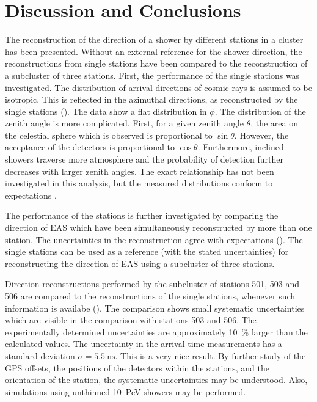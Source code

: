 \section{Discussion and Conclusions}

The reconstruction of the direction of a shower by different stations in a
cluster has been presented. Without an external reference for the shower
direction, the reconstructions from single stations have been compared to the
reconstruction of a subcluster of three stations. First, the performance of the
single stations was investigated. The distribution of arrival directions of
cosmic rays is assumed to be isotropic.
This is reflected in the azimuthal directions, as reconstructed by the single
stations (). The data show a flat distribution
in $\phi$. The distribution of the zenith angle is more complicated. First, for
a given zenith angle $\theta$, the area on the celestial sphere which is
observed is proportional to $\sin\theta$.
However, the acceptance of the detectors is proportional to $\cos\theta$.
Furthermore, inclined showers traverse more atmosphere and the probability of
detection further decreases with larger zenith angles. The exact relationship
has not been investigated in this analysis, but the measured distributions
conform to expectations \cite{Grupen:2005}.

The performance of the stations is further investigated by comparing the
direction of EAS which have been simultaneously reconstructed by more than one
station. The uncertainties in the reconstruction agree with
expectations (). The single
stations can be used as a reference (with the stated uncertainties) for
reconstructing the direction of EAS using a subcluster of three stations.

Direction reconstructions performed by the subcluster of stations 501, 503 and
506 are compared to the reconstructions of the single stations, whenever such
information is availabe (). The comparison
shows small systematic uncertainties which are visible in the comparison with
stations 503 and 506. The experimentally determined uncertainties are
approximately \SI{10}{\percent} larger than the calculated values. The
uncertainty in the arrival time measurements has a standard deviation $\sigma =
\SI{5.5}{\nano\second}$. This is a very nice result. By further study of the GPS
offsets, the positions of the detectors within the stations, and the orientation
of the station, the systematic uncertainties may be understood. Also,
simulations using unthinned \SI{10}{\peta\electronvolt} showers may be
performed.

